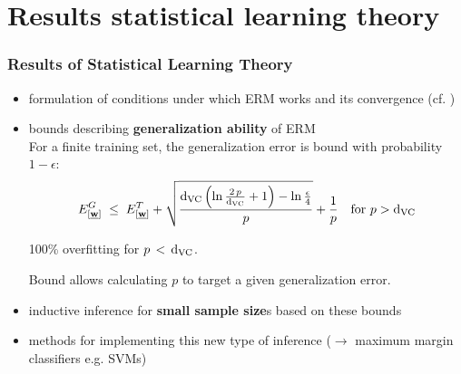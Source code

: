 \section{Results statistical learning theory}

\begin{frame}\frametitle{Results of Statistical Learning Theory}
		\begin{itemize}
			\item formulation of conditions under which ERM works and its convergence (cf. )
			\item bounds describing \textbf{generalization ability} of ERM \\
            
            For a finite training set, the generalization error is bound with probability $1-\epsilon$:
            \begin{equation}
				E^{G}_{[\underline{\mathbf{w}}]} \;\le\; E^{T}_{[\underline{\mathbf{w}}]} + \sqrt{\frac{\mathrm{d}_{\mathrm{VC}} \left(\ln \frac{2\,p}{\mathrm{d}_{\mathrm{VC}}} + 1\right)-\ln\frac{\epsilon}{4}}{p}} +\frac{1}{p} \quad \text{for } p > \mathrm{d}_{\mathrm{VC}}
				\label{eq:generalizationresults}
            \end{equation}
            
            
            
            100\% overfitting for $p\,<\,\mathrm{d}_{\mathrm{VC}}$.
            
            Bound allows calculating $p$ to target a given generalization error.
            
			\item inductive inference for \textbf{small sample size}s 
				based on these bounds
			\item methods for implementing this new type 
				of inference ($\rightarrow$ maximum margin classifiers e.g. {SVMs})
		\end{itemize}
\end{frame}
